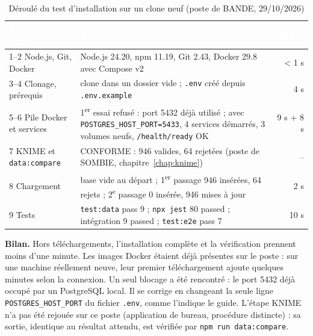 \begin{table}[H]
\centering\small
\caption{Déroulé du test d'installation sur un clone neuf (poste de BANDE, 29/10/2026)}
\label{tab:test-installation}
\begin{tabularx}{\linewidth}{|l|X|r|}
\hline
\rowcolor{bluedark}\textcolor{white}{\textbf{Étape du guide}} & \textcolor{white}{\textbf{Résultat}} & \textcolor{white}{\textbf{Durée}} \\
\hline
1--2 Node.js, Git, Docker & Node.js 24.20, npm 11.19, Git 2.43, Docker 29.8 avec Compose v2 & < 1 s \\
\hline
3--4 Clonage, prérequis & clone dans un dossier vide ; \texttt{.env} créé depuis \texttt{.env.example} & 4 s \\
\hline
5--6 Pile Docker et services & 1\textsuperscript{er} essai refusé : port 5432 déjà utilisé ; avec \texttt{POSTGRES\_HOST\_PORT=5433}, 4 services démarrés, 3 volumes neufs, \texttt{/health/ready} OK & 9 s + 8 s \\
\hline
7 KNIME et \texttt{data:compare} & CONFORME : 946 valides, 64 rejetées (poste de SOMBIE, chapitre~\ref{chap:knime}) & -- \\
\hline
8 Chargement & base vide au départ ; 1\textsuperscript{er} passage 946 insérées, 64 rejets ; 2\textsuperscript{e} passage 0 insérée, 946 mises à jour & 2 s \\
\hline
9 Tests & \texttt{test:data} pass 9 ; \texttt{npx jest} 80 passed ; intégration 9 passed ; \texttt{test:e2e} pass 7 & 10 s \\
\hline
\end{tabularx}
\end{table}

\textbf{Bilan.} Hors téléchargements, l'installation complète et la vérification prennent moins
d'une minute. Les images Docker étaient déjà présentes sur le poste : sur une machine réellement
neuve, leur premier téléchargement ajoute quelques minutes selon la connexion. Un seul blocage
a été rencontré : le port 5432 déjà occupé par un PostgreSQL local. Il se corrige en changeant la
seule ligne \texttt{POSTGRES\_HOST\_PORT} du fichier \texttt{.env}, comme l'indique le guide.
L'étape KNIME n'a pas été rejouée sur ce poste (application de bureau, procédure distincte) : sa
sortie, identique au résultat attendu, est vérifiée par \texttt{npm run data:compare}.
